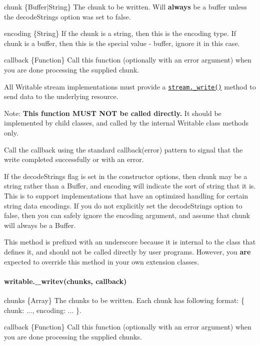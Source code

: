 \begin{DoxyItemize}
\item {\ttfamily chunk} \{Buffer$\vert$\+String\} The chunk to be written. Will {\bfseries always} be a buffer unless the {\ttfamily decode\+Strings} option was set to {\ttfamily false}.
\item {\ttfamily encoding} \{String\} If the chunk is a string, then this is the encoding type. If chunk is a buffer, then this is the special value -\/ \textquotesingle{}buffer\textquotesingle{}, ignore it in this case.
\item {\ttfamily callback} \{Function\} Call this function (optionally with an error argument) when you are done processing the supplied chunk.
\end{DoxyItemize}

All Writable stream implementations must provide a \href{#stream_writable_write_chunk_encoding_callback_1}{\tt {\ttfamily stream.\+\_\+write()}} method to send data to the underlying resource.

Note\+: {\bfseries This function M\+U\+ST N\+OT be called directly.} It should be implemented by child classes, and called by the internal Writable class methods only.

Call the callback using the standard {\ttfamily callback(error)} pattern to signal that the write completed successfully or with an error.

If the {\ttfamily decode\+Strings} flag is set in the constructor options, then {\ttfamily chunk} may be a string rather than a Buffer, and {\ttfamily encoding} will indicate the sort of string that it is. This is to support implementations that have an optimized handling for certain string data encodings. If you do not explicitly set the {\ttfamily decode\+Strings} option to {\ttfamily false}, then you can safely ignore the {\ttfamily encoding} argument, and assume that {\ttfamily chunk} will always be a Buffer.

This method is prefixed with an underscore because it is internal to the class that defines it, and should not be called directly by user programs. However, you {\bfseries are} expected to override this method in your own extension classes.

\paragraph*{writable.\+\_\+writev(chunks, callback)}


\begin{DoxyItemize}
\item {\ttfamily chunks} \{Array\} The chunks to be written. Each chunk has following format\+: {\ttfamily \{ chunk\+: ..., encoding\+: ... \}}.
\item {\ttfamily callback} \{Function\} Call this function (optionally with an error argument) when you are done processing the supplied chunks.
\end{DoxyItemize}

